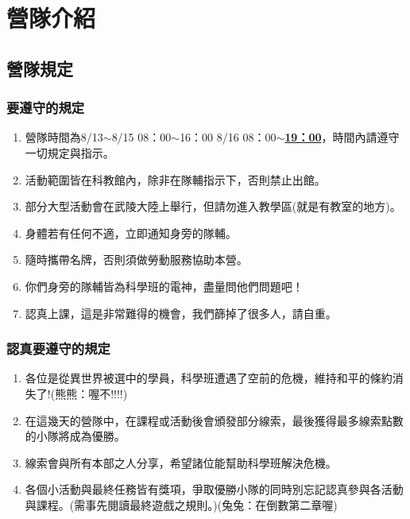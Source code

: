 \chapter{營隊介紹}

\section{營隊規定}


\subsection{要遵守的規定}
\begin{enumerate}[label=\arabic*)]
\item 營隊時間為8/13$\sim$8/15 08：00$\sim$16：00 8/16 08：00$\sim$\underline{\textbf{19：00}}，時間內請遵守一切規定與指示。
\item 活動範圍皆在科教館內，除非在隊輔指示下，否則禁止出館。
\item 部分大型活動會在武陵大陸上舉行，但請勿進入教學區(就是有教室的地方)。
\item 身體若有任何不適，立即通知身旁的隊輔。
\item 隨時攜帶名牌，否則須做勞動服務協助本營。
\item 你們身旁的隊輔皆為科學班的電神，盡量問他們問題吧！
\item 認真上課，這是非常難得的機會，我們篩掉了很多人，請自重。
\end{enumerate}

\subsection{認真要遵守的規定}
\begin{enumerate}[label=\arabic*)]
\item 各位是從異世界被選中的學員，科學班遭遇了空前的危機，維持和平的條約消失了!(熊熊：喔不!!!!)
\item 在這幾天的營隊中，在課程或活動後會頒發部分線索，最後獲得最多線索點數的小隊將成為優勝。
\item 線索會與所有本部之人分享，希望諸位能幫助科學班解決危機。
\item 各個小活動與最終任務皆有獎項，爭取優勝小隊的同時別忘記認真參與各活動與課程。(需事先閱讀最終遊戲之規則。)(兔兔：在倒數第二章喔)
\end{enumerate}
\newpage

